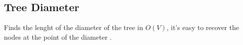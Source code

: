 \subsection{Tree Diameter}

Finds the lenght of the diameter of the tree in $O(V)$, it's easy to recover the nodes at the point of the diameter .
